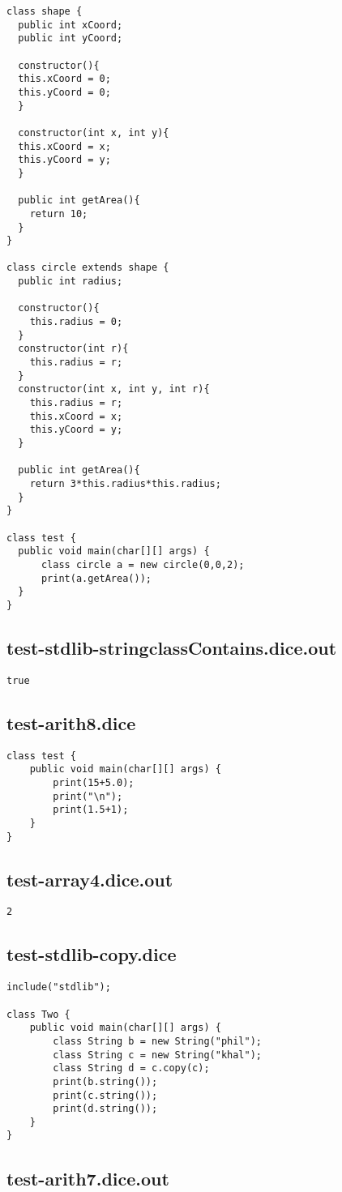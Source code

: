 \begin{verbatim}
class shape {
  public int xCoord;
  public int yCoord;

  constructor(){
  this.xCoord = 0;
  this.yCoord = 0;
  }

  constructor(int x, int y){
  this.xCoord = x;
  this.yCoord = y;
  }

  public int getArea(){
    return 10;
  }
}

class circle extends shape {
  public int radius;

  constructor(){
  	this.radius = 0;
  }
  constructor(int r){
  	this.radius = r;
  }
  constructor(int x, int y, int r){
  	this.radius = r;
  	this.xCoord = x;
  	this.yCoord = y;
  }

  public int getArea(){
    return 3*this.radius*this.radius;
  }
}

class test {
  public void main(char[][] args) {
      class circle a = new circle(0,0,2); 
      print(a.getArea());
  }
}
\end{verbatim}\pagebreak\subsection{test-stdlib-stringclassContains.dice.out}
\begin{verbatim}
true
\end{verbatim}\pagebreak\subsection{test-arith8.dice}
\begin{verbatim}
class test {
	public void main(char[][] args) {
		print(15+5.0);
		print("\n");
		print(1.5+1);
	}
}

\end{verbatim}\pagebreak\subsection{test-array4.dice.out}
\begin{verbatim}
2
\end{verbatim}\pagebreak\subsection{test-stdlib-copy.dice}
\begin{verbatim}
include("stdlib");

class Two {
	public void main(char[][] args) {
        class String b = new String("phil");
        class String c = new String("khal");
        class String d = c.copy(c);
        print(b.string());
        print(c.string());
        print(d.string());
	}
}
\end{verbatim}\pagebreak\subsection{test-arith7.dice.out}
